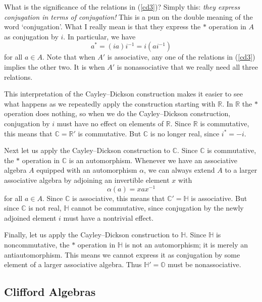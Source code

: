 \documentclass[12pt]{article}
\newcommand\R{{\mathbb R}}
\newcommand\C{{\mathbb C}}
\renewcommand\H{{\mathbb H}}
\renewcommand\O{{\mathbb O}}
\begin{document}
What is the significance of the relations in (\ref{cd3})?   Simply   
this: {\sl they express conjugation in terms of conjugation!}  This is a pun   
on the double meaning of the word `conjugation'.  What I really mean is   
that they express the $\ast$ operation in $A$ as conjugation by $i$.  In   
particular, we have   
\[       a^\ast = (ia)i^{-1} = i(ai^{-1})   \]   
for all $a \in A$.  Note that when $A'$ is associative, any one of the   
relations in (\ref{cd3}) implies the other two.  It is when $A'$ is   
nonassociative that we really need all three relations.   

This interpretation of the Cayley--Dickson construction makes it easier   
to see what happens as we repeatedly apply the construction starting with   
$\R$.  In $\R$ the $\ast$ operation does nothing, so when we do the   
Cayley--Dickson construction, conjugation by $i$ must have no effect on   
elements of $\R$.  Since $\R$ is commutative, this means that $\C = \R'$   
is commutative.  But $\C$ is no longer real, since $i^* = -i$.   
   
Next let us apply the Cayley--Dickson construction to $\C$.  Since $\C$   
is commutative, the $\ast$ operation in $\C$ is an automorphism.  Whenever   
we have an associative algebra $A$ equipped with an automorphism $\alpha$,    
we can always extend $A$ to a larger associative algebra by adjoining an    
invertible element $x$ with    
\[                \alpha(a) = xax^{-1}  \]    
for all $a \in A$.  Since $\C$ is associative, this means that $\C' =   
\H$ is associative.  But since $\C$ is not real, $\H$ cannot be   
commutative, since conjugation by the newly adjoined element $i$ must   
have a nontrivial effect.   
   
Finally, let us apply the Cayley--Dickson construction to $\H$.   Since   
$\H$ is noncommutative, the $\ast$ operation in $\H$ is not an   
automorphism; it is merely an antiautomorphism.   This means we cannot   
express it as conjugation by some element of a larger associative   
algebra.  Thus $\H' = \O$ must be nonassociative.     

\subsection{Clifford Algebras} \label{clifford}      
\end{document}
